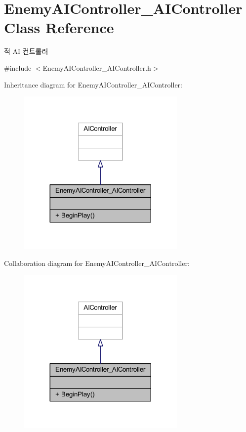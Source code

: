 \hypertarget{class_enemy_a_i_controller___a_i_controller}{}\section{Enemy\+A\+I\+Controller\+\_\+\+A\+I\+Controller Class Reference}
\label{class_enemy_a_i_controller___a_i_controller}


적 AI 컨트롤러  




{\ttfamily \#include $<$Enemy\+A\+I\+Controller\+\_\+\+A\+I\+Controller.\+h$>$}



Inheritance diagram for Enemy\+A\+I\+Controller\+\_\+\+A\+I\+Controller\+:
\nopagebreak
\begin{figure}[H]
\begin{center}
\leavevmode
\includegraphics[width=233pt]{class_enemy_a_i_controller___a_i_controller__inherit__graph}
\end{center}
\end{figure}


Collaboration diagram for Enemy\+A\+I\+Controller\+\_\+\+A\+I\+Controller\+:
\nopagebreak
\begin{figure}[H]
\begin{center}
\leavevmode
\includegraphics[width=233pt]{class_enemy_a_i_controller___a_i_controller__coll__graph}
\end{center}
\end{figure}
